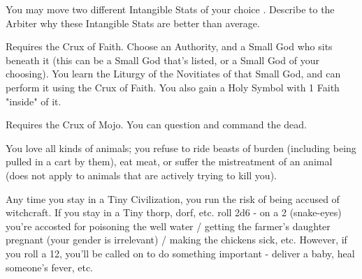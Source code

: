 {    

    You may move two different Intangible Stats of your choice \DCUP.  Describe to the Arbiter why these Intangible Stats are better than average.


    Requires the Crux of Faith.  Choose an Authority, and a Small God who sits beneath it (this can be a Small God that's listed, or a Small God of your choosing).  You learn the Liturgy of the Novitiates of that Small God, and can perform it using the Crux of Faith.  You also gain a Holy Symbol with 1 Faith \POOL "inside" of it.\footnotemark[\value{footnote}]


    Requires the Crux of Mojo.  You can question and command the dead.\footnotemark[\value{footnote}]






  You love all kinds of animals; you refuse to ride beasts of burden (including being pulled in a cart by them), eat meat, or suffer the mistreatment of an animal (does not apply to animals that are actively trying to kill you).

  
  Any time you stay in a Tiny Civilization, you run the risk of being accused of witchcraft.  If you stay in a Tiny thorp, dorf, etc. roll 2d6 - on a 2 (snake-eyes) you're accosted for poisoning the well water / getting the farmer's daughter pregnant (your gender is irrelevant) / making the chickens sick, etc.  However, if you roll a 12, you'll be called on to do something important - deliver a baby, heal someone's fever, etc.

}
